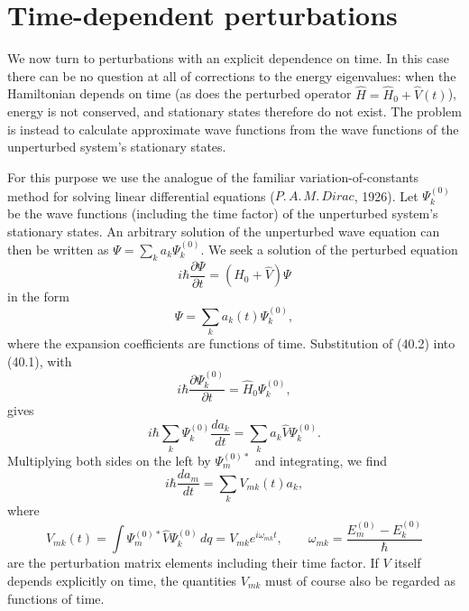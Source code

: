 \section{Time-dependent perturbations}

We now turn to perturbations with an explicit dependence on time. In this case
there can be no question at all of corrections to the energy eigenvalues:
when the Hamiltonian depends on time (as does the perturbed operator
$\hat H=\hat H_0+\hat V(t)$), energy is not conserved, and stationary states
therefore do not exist. The problem is instead to calculate approximate wave
functions from the wave functions of the unperturbed system's stationary
states.

For this purpose we use the analogue of the familiar variation-of-constants
method for solving linear differential equations ($P.\,A.\,M.\,Dirac$, 1926).
Let $\Psi_k^{(0)}$ be the wave functions (including the time factor) of the
unperturbed system's stationary states. An arbitrary solution of the
unperturbed wave equation can then be written as
$\Psi=\sum_k a_k\Psi_k^{(0)}$. We seek a solution of the perturbed equation
\begin{equation}
  i\hbar\frac{\partial\Psi}{\partial t}=(\hat H_0+\hat V)\Psi
  \tag{40.1}
\end{equation}
in the form
\begin{equation}
  \Psi=\sum_k a_k(t)\Psi_k^{(0)},
  \tag{40.2}
\end{equation}
where the expansion coefficients are functions of time. Substitution of
(40.2) into (40.1), with
\[
  i\hbar\frac{\partial\Psi_k^{(0)}}{\partial t}=\hat H_0\Psi_k^{(0)},
\]
gives
\[
  i\hbar\sum_k\Psi_k^{(0)}\frac{da_k}{dt}
  =\sum_k a_k\hat V\Psi_k^{(0)}.
\]
Multiplying both sides on the left by $\Psi_m^{(0)*}$ and integrating, we find
\begin{equation}
  i\hbar\frac{da_m}{dt}=\sum_k V_{mk}(t)a_k,
  \tag{40.3}
\end{equation}
where
\[
  V_{mk}(t)=\int\Psi_m^{(0)*}\hat V\Psi_k^{(0)}\,dq
  =V_{mk}e^{i\omega_{mk}t},
  \qquad
  \omega_{mk}=\frac{E_m^{(0)}-E_k^{(0)}}{\hbar}
\]
are the perturbation matrix elements including their time factor. If $V$
itself depends explicitly on time, the quantities $V_{mk}$ must of course
also be regarded as functions of time.

